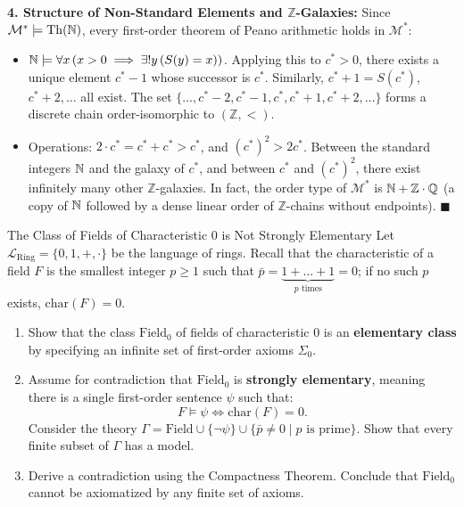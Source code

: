 \begin{solution}
\textbf{4. Structure of Non-Standard Elements and $\mathbb{Z}$-Galaxies:}
Since $\mathcal{M}^* \models \mathrm{Th}(\mathbb{N})$, every first-order theorem of Peano arithmetic holds in $\mathcal{M}^*$:
\begin{itemize}[leftmargin=1.4em,itemsep=2pt]
  \item $\mathbb{N} \models \forall x\, (x > 0 \implies \exists! y\, (S(y) = x))$.
  Applying this to $c^* > 0$, there exists a unique element $c^* - 1$ whose successor is $c^*$.
  Similarly, $c^* + 1 = S(c^*)$, $c^* + 2, \dots$ all exist.
  The set $\{ \dots, c^* - 2, c^* - 1, c^*, c^* + 1, c^* + 2, \dots \}$ forms a discrete chain order-isomorphic to $(\mathbb{Z}, <)$.
  \item Operations: $2 \cdot c^* = c^* + c^* > c^*$, and $(c^*)^2 > 2c^*$.
  Between the standard integers $\mathbb{N}$ and the galaxy of $c^*$, and between $c^*$ and $(c^*)^2$, there exist infinitely many other $\mathbb{Z}$-galaxies.
  In fact, the order type of $\mathcal{M}^*$ is $\mathbb{N} + \mathbb{Z} \cdot \mathbb{Q}$ (a copy of $\mathbb{N}$ followed by a dense linear order of $\mathbb{Z}$-chains without endpoints). \hfill $\blacksquare$
\end{itemize}
\end{solution}

\begin{exercise}{The Class of Fields of Characteristic 0 is Not Strongly Elementary}
Let $\mathcal{L}_{\mathrm{Ring}} = \{0, 1, +, \cdot\}$ be the language of rings.
Recall that the characteristic of a field $F$ is the smallest integer $p \ge 1$ such that $\bar{p} = \underbrace{1 + \dots + 1}_{p \text{ times}} = 0$; if no such $p$ exists, $\mathrm{char}(F) = 0$.
\begin{enumerate}[leftmargin=1.5em,itemsep=2pt]
  \item Show that the class $\mathrm{Field}_0$ of fields of characteristic 0 is an \textbf{elementary class} by specifying an infinite set of first-order axioms $\Sigma_0$.
  \item Assume for contradiction that $\mathrm{Field}_0$ is \textbf{strongly elementary}, meaning there is a single first-order sentence $\psi$ such that:
  \[
  F \models \psi \iff \mathrm{char}(F) = 0.
  \]
  Consider the theory $\Gamma = \mathrm{Field} \cup \{\neg \psi\} \cup \{ \bar{p} \ne 0 \mid p \text{ is prime} \}$.
  Show that every finite subset of $\Gamma$ has a model.
  \item Derive a contradiction using the Compactness Theorem. Conclude that $\mathrm{Field}_0$ cannot be axiomatized by any finite set of axioms.
\end{enumerate}
\end{exercise}

